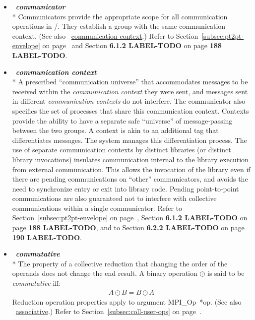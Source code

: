\begin{itemize}
\label{glossary:communicator}
\item  ~\hypertarget{glossary:communicator}{\emph{\textbf{communicator}}} \\*
 Communicators provide the appropriate
scope for all communication operations in \MPI/.
They establish a group with the same communication context.
(See also ~\hyperlink{glossary:communication_context}{communication context}.)
 Refer to Section~\ref{subsec:pt2pt-envelope} on page~\pageref{subsec:pt2pt-envelope} and Section {\bf 6.1.2 LABEL-TODO} on page {\bf 188 LABEL-TODO}.

\label{glossary:communication_context}
\item  ~\hypertarget{glossary:communication_context}{\emph{\textbf{communication context}}} \\*
A prescribed ``communication universe'' that accommodates messages to be 
received within the \emph{communication context} they were sent, and messages 
sent in different \emph{communication contexts} do not interfere.
The communicator also specifies the set of processes that share this
communication context.
Contexts provide the ability to have
a separate safe ``universe''
of message-passing between the two groups.  
A context is akin to an additional
tag that differentiates messages.
The system manages this differentiation process.
The use of separate communication
contexts by distinct libraries (or distinct library invocations)
insulates communication internal to the library execution from
external communication.  This allows the invocation of the library even if
there are pending communications
on ``other'' communicators, and avoids the need to
synchronize entry or exit into library code.  Pending point-to-point
communications are also guaranteed not to interfere with collective
communications within a single communicator.
 Refer to Section~\ref{subsec:pt2pt-envelope} on page~\pageref{subsec:pt2pt-envelope},
Section {\bf 6.1.2 LABEL-TODO} on page {\bf 188 LABEL-TODO},
and to Section {\bf 6.2.2 LABEL-TODO} on page {\bf 190 LABEL-TODO}.

\label{glossary:commutative}
\item  ~\hypertarget{glossary:commutative}{\emph{\textbf{commutative}}} \\*
The property of a collective reduction that changing the order of the operands does not change the end result. 
A binary operation $  \odot $ is said to be \emph{commutative} iff:
\begin{eqnarray}
A \odot B = B \odot A
\end{eqnarray}
Reduction operation properties apply to  argument MPI\_Op~*op.
(See also ~\hyperlink{glossary:associative}{associative}.)
Refer to Section~\ref{subsec:coll-user-ops} on page~\pageref{subsec:coll-user-ops}.


\end{itemize}
